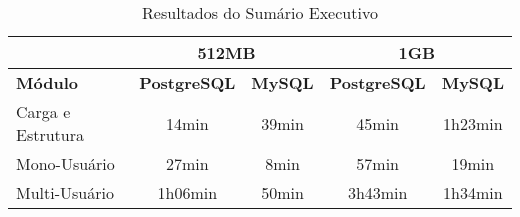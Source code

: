 \begin{table}[H]
    \centering
    \caption[MySQL - Resultados do Sumário Executivo ]{Resultados do Sumário Executivo
    \label{tab:comparisonMySql}}
\begin{tabular}{l|c|c|c|c|}
\cline{2-5}
 & \multicolumn{2}{c|}{\textbf{512MB}} & \multicolumn{2}{c|}{\textbf{1GB}} \\ \hline
\multicolumn{1}{|l|}{\textbf{Módulo}} & \textbf{PostgreSQL} & \textbf{MySQL} & \textbf{PostgreSQL} & \textbf{MySQL} \\ \hline
\multicolumn{1}{|l|}{Carga e Estrutura} & 14min & 39min & 45min & 1h23min \\ \hline
\multicolumn{1}{|l|}{Mono-Usuário} & 27min & 8min & 57min & 19min \\ \hline
\multicolumn{1}{|l|}{Multi-Usuário} & 1h06min & 50min & 3h43min & 1h34min \\ \hline
\end{tabular}
\end{table}


